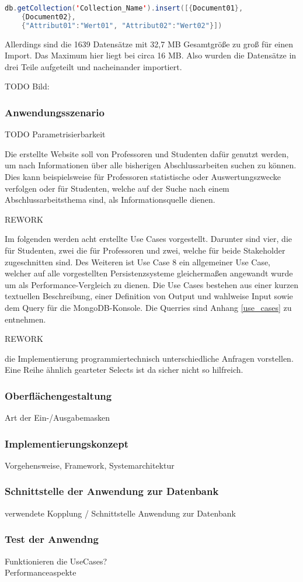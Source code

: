 \begin{lstlisting}[caption={MongoDB Importfunktion},language=java,captionpos=t,numbers=none, numberstyle=\tiny,breaklines=true]
db.getCollection('Collection_Name').insert([{Document01}, 
 	{Document02},
 	{"Attribut01":"Wert01", "Attribut02":"Wert02"}])
\end{lstlisting}\label{lst:mongodb_import}

Allerdings sind die 1639 Datensätze mit 32,7 MB Gesamtgröße zu groß für einen Import. Das Maximum hier liegt bei circa 16 MB. Also wurden die Datensätze in drei Teile aufgeteilt und nacheinander importiert. 

TODO Bild: 

\subsubsection{Anwendungsszenario}
TODO Parametrisierbarkeit 

Die erstellte Website soll von Professoren und Studenten dafür genutzt werden, um nach Informationen über alle bisherigen Abschlussarbeiten suchen zu können. Dies kann beispielsweise für Professoren statistische oder Auswertungszwecke verfolgen oder für Studenten, welche auf der Suche nach einem Abschlussarbeitsthema sind, als Informationsquelle dienen. 

REWORK

Im folgenden werden acht erstellte Use Cases vorgestellt. Darunter sind vier, die für Studenten, zwei die für Professoren und zwei, welche für beide Stakeholder zugeschnitten sind. Des Weiteren ist Use Case 8 ein allgemeiner Use Case, welcher auf alle vorgestellten Persistenzsysteme gleichermaßen angewandt wurde um als Performance-Vergleich zu dienen. Die Use Cases bestehen aus einer kurzen textuellen Beschreibung, einer Definition von Output und wahlweise Input sowie dem Query für die MongoDB-Konsole. Die Querries sind Anhang \ref{use_cases} zu entnehmen. 

REWORK

die Implementierung programmiertechnisch unterschiedliche Anfragen vorstellen. 
Eine Reihe ähnlich gearteter Selects ist da sicher nicht so hilfreich. 

\subsubsection{Oberflächengestaltung}
Art der Ein-/Ausgabemasken 

\subsubsection{Implementierungskonzept}
Vorgehensweise, Framework, Systemarchitektur 

\subsubsection{Schnittstelle der Anwendung zur Datenbank}
verwendete Kopplung / Schnittstelle Anwendung zur Datenbank 

\subsubsection{Test der Anwendng}
Funktionieren die UseCases? \\
Performanceaspekte
